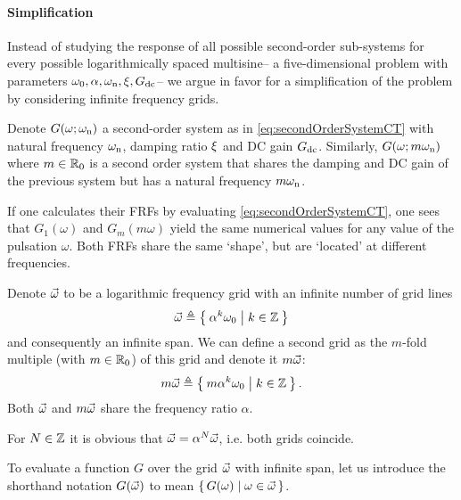   \paragraph{Simplification}
  Instead of studying the response of all possible second-order sub-systems for every possible logarithmically spaced multisine-- a five-dimensional problem with parameters $\omega_0, \alpha, \omega_{\mathrm{n}}, \xi, G_{\mathrm{dc}}$-- we argue in favor for a simplification of the problem by considering infinite frequency grids.

  Denote $G(\omega; \omega_{\mathrm{n}})$ a second-order system as in \eqref{eq:secondOrderSystemCT} with natural frequency $\omega_{\mathrm{n}}$, damping ratio $\xi$ and \gls{DC} gain $G_{\mathrm{dc}}$.
  Similarly, $G(\omega; m\omega_{\mathrm{n}})$ where $m \in \mathbb{R}_{0}$ is a second order system that shares the damping and \gls{DC} gain of the previous system but has a natural frequency $m\omega_{\mathrm{n}}$.

  If one calculates their FRFs by evaluating \eqref{eq:secondOrderSystemCT}, one sees that $G_1(\omega)$ and $G_m(m\omega)$ yield the same numerical values for any value of the pulsation $\omega$.
  Both FRFs share the same `shape', but are `located' at different frequencies.

  Denote $\vec{\omega}$ to be a logarithmic frequency grid with an infinite number of grid lines
  \begin{equation}
    \vec{\omega} \triangleq \Set{\alpha^k \omega_0 | k \in \ensuremath{\mathbb{Z}}}
    \label{eq:freqGridLog}
  \end{equation}
  and consequently an infinite span.
  We can define a second grid as the $m$-fold multiple (with $m \in \mathbb{R}_{0}$) of this grid and denote it $m\vec{\omega}$:
  \begin{equation}
    m \vec{\omega} \triangleq \Set{m \alpha^k \omega_0 | k \in \ensuremath{\mathbb{Z}}}
    \text{.}
  \end{equation}
  Both $\vec{\omega}$ and $m\vec{\omega}$ share the frequency ratio $\alpha$.
  \begin{remark} \label{rem:exc:gridscaling}
    For $N \in \mathbb{Z}$ it is obvious that $\vec{\omega} = \alpha^{N} \vec{\omega}$, i.e. both grids coincide.
  \end{remark}

  \begin{definition}
  To evaluate a function $G$ over the grid $\vec{\omega}$ with infinite span, let us introduce the shorthand notation $G(\vec{\omega})$ to mean $\set{G(\omega) | \omega \in \ensuremath{\vec{\omega}}}$.
  \end{definition}

